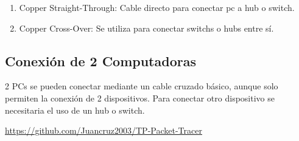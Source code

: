 \documentclass{article}
\begin{document}
\begin{enumerate}
\item Copper Straight-Through: Cable directo para conectar pc a hub o switch.
\item Copper Cross-Over: Se utiliza para conectar switchs o hubs entre sí.
\end{enumerate}

\subsection{Conexión de 2 Computadoras}
2 PCs se pueden conectar mediante un cable cruzado básico, aunque solo permiten la conexión de 2 dispositivos. Para conectar otro dispositivo se necesitaria el uso de un hub o switch.

\cite{juancruz}


\href{https://github.com/Juancruz2003/TP-Packet-Tracer}{https://github.com/Juancruz2003/TP-Packet-Tracer}
\end{document}
